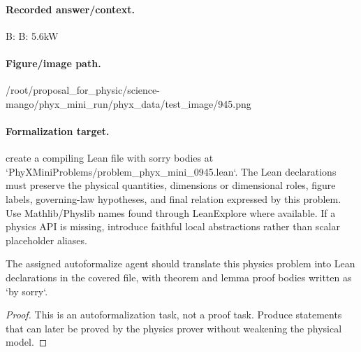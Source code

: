 \paragraph{Recorded answer/context.}
B: B: 5.6kW

\paragraph{Figure/image path.}
/root/proposal\_for\_physic/science-mango/phyx\_mini\_run/phyx\_data/test\_image/945.png

\paragraph{Formalization target.}
create a compiling Lean file with sorry bodies at `PhyXMiniProblems/problem\_phyx\_mini\_0945.lean`. The Lean declarations must preserve the physical quantities, dimensions or dimensional roles, figure labels, governing-law hypotheses, and final relation expressed by this problem.
Use Mathlib/Physlib names found through LeanExplore where available. If a physics API is missing, introduce faithful local abstractions rather than scalar placeholder aliases.

\begin{theorem}
\label{thm:physics:phyx_mini_0945:target}
The assigned autoformalize agent should translate this physics problem into Lean declarations in the covered file, with theorem and lemma proof bodies written as `by sorry`.
\end{theorem}
\begin{proof}
This is an autoformalization task, not a proof task. Produce statements that can later be proved by the physics prover without weakening the physical model.
\end{proof}

